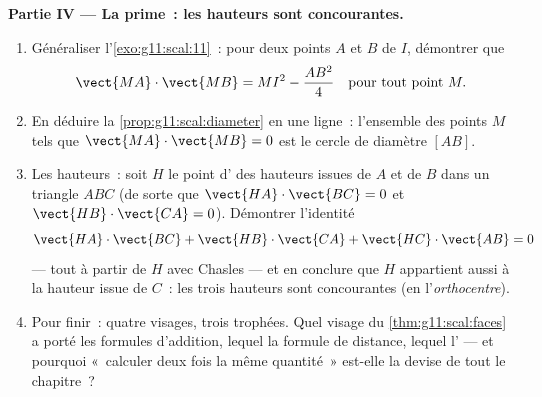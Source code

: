 \begin{problem}
\medskip
\noindent\textbf{Partie IV --- La prime~: les hauteurs sont
concourantes.}
\begin{enumerate}[resume]
  \item Généraliser l'\cref{exo:g11:scal:11}~: pour deux points $A$
        et $B$ de  $I$, démontrer que
        \[
        \vect{MA} \cdot \vect{MB} = MI^2 - \frac{AB^2}{4}
        \quad\text{pour tout point } M .
        \]
  \item En déduire la \cref{prop:g11:scal:diameter} en une ligne~:
        l'ensemble des points $M$ tels que
        $\vect{MA} \cdot \vect{MB} = 0$ est le cercle de diamètre
        $[AB]$.
  \item Les hauteurs~: soit $H$ le point d' des hauteurs
        issues de $A$ et de $B$ dans un triangle $ABC$ (de sorte que
        $\vect{HA} \cdot \vect{BC} = 0$ et
        $\vect{HB} \cdot \vect{CA} = 0$). Démontrer l'identité
        \[
        \vect{HA} \cdot \vect{BC} + \vect{HB} \cdot \vect{CA}
        + \vect{HC} \cdot \vect{AB} = 0
        \]
        --- tout  à partir de $H$ avec Chasles --- et en
        conclure que $H$ appartient aussi à la hauteur issue de
        $C$~: les trois hauteurs sont concourantes (en
        l'\emph{orthocentre}).
  \item Pour finir~: quatre visages, trois trophées. Quel visage du
        \cref{thm:g11:scal:faces} a porté les formules d'addition,
        lequel la formule de distance, lequel l' --- et
        pourquoi «~calculer deux fois la même quantité~» est-elle la
        devise de tout le chapitre~?
\end{enumerate}
\end{problem}
